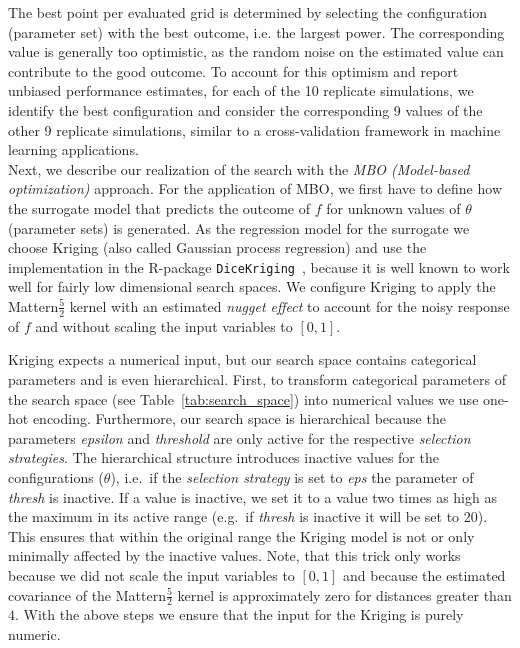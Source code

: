 \documentclass[bimj,fleqn]{w-art}
\theoremstyle{plain}
\theoremstyle{definition}
\begin{document}
The best point per evaluated grid is determined by selecting the configuration (parameter set) with the best outcome, i.e. the largest power.
The corresponding value is generally too optimistic, as the random noise on the estimated value can contribute to the good outcome.
To account for this optimism and report unbiased performance estimates, for each of the 10 replicate simulations, we identify the best configuration and consider the corresponding 9 values of the other 9 replicate simulations, similar to a cross-validation framework in machine learning applications. \\

Next, we describe our realization of the search with the \emph{MBO (Model-based optimization)} approach.
For the application of MBO, we first have to define how the surrogate model that predicts the outcome of $f$ for unknown values of $\theta$ (parameter sets) is generated.
As the regression model for the surrogate we choose Kriging (also called Gaussian process regression) and use the implementation in the R-package \texttt{DiceKriging}~\citep{roustant_dicekriging_2012}, because it is well known to work well for fairly low dimensional search spaces.
We configure Kriging to apply the Mattern$\frac{5}{2}$ kernel with an estimated \emph{nugget effect} to account for the noisy response of $f$ and without scaling the input variables to $[0,1]$.

Kriging expects a numerical input, but our search space contains categorical parameters and is even hierarchical.
First, to transform categorical parameters of the search space (see Table~\ref{tab:search_space}) into numerical values we use one-hot encoding.
Furthermore, our search space is hierarchical because the parameters \emph{epsilon} and \emph{threshold} are only active for the respective \emph{selection strategies}.
The hierarchical structure introduces inactive values for the configurations ($\theta$), i.e.\ if the \emph{selection strategy} is set to \emph{eps} the parameter of \emph{thresh} is inactive.
If a value is inactive, we set it to a value two times as high as the maximum in its active range (e.g.\ if \emph{thresh} is inactive it will be set to 20).
This ensures that within the original range the Kriging model is not or only minimally affected by the inactive values.
Note, that this trick only works because we did not scale the input variables to $[0,1]$ and because the estimated covariance of the Mattern$\frac{5}{2}$ kernel is approximately zero for distances greater than $4$.
With the above steps we ensure that the input for the Kriging is purely numeric.
\end{document}
